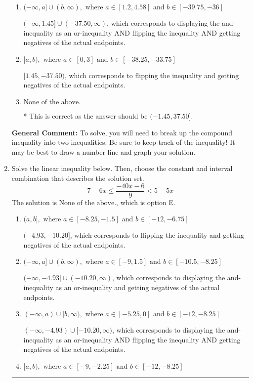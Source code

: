 \documentclass{extbook}[14pt]
\newcommand{\litem}[1]{\item #1

\rule{\textwidth}{0.4pt}}
\begin{document}
\begin{enumerate}
{\begin{enumerate}[label=\Alph*.]
$(1.45, -37.50]$, which is the correct interval but negatives of the actual endpoints.
\item \( (-\infty, a] \cup (b, \infty), \text{ where } a \in [1.2, 4.58] \text{ and } b \in [-39.75, -36] \)

$(-\infty, 1.45] \cup (-37.50, \infty)$, which corresponds to displaying the and-inequality as an or-inequality AND flipping the inequality AND getting negatives of the actual endpoints.
\item \( [a, b), \text{ where } a \in [0, 3] \text{ and } b \in [-38.25, -33.75] \)

$[1.45, -37.50)$, which corresponds to flipping the inequality and getting negatives of the actual endpoints.
\item \( \text{None of the above.} \)

* This is correct as the answer should be $(-1.45, 37.50]$.
\end{enumerate}

\textbf{General Comment:} To solve, you will need to break up the compound inequality into two inequalities. Be sure to keep track of the inequality! It may be best to draw a number line and graph your solution.
}
\litem{
Solve the linear inequality below. Then, choose the constant and interval combination that describes the solution set.
\[ 7 - 6 x \leq \frac{-40 x - 6}{9} < 5 - 5 x \]The solution is \( \text{None of the above.} \), which is option E.\begin{enumerate}[label=\Alph*.]
\item \( (a, b], \text{ where } a \in [-8.25, -1.5] \text{ and } b \in [-12, -6.75] \)

$(-4.93, -10.20]$, which corresponds to flipping the inequality and getting negatives of the actual endpoints.
\item \( (-\infty, a] \cup (b, \infty), \text{ where } a \in [-9, 1.5] \text{ and } b \in [-10.5, -8.25] \)

$(-\infty, -4.93] \cup (-10.20, \infty)$, which corresponds to displaying the and-inequality as an or-inequality and getting negatives of the actual endpoints.
\item \( (-\infty, a) \cup [b, \infty), \text{ where } a \in [-5.25, 0] \text{ and } b \in [-12, -8.25] \)

$(-\infty, -4.93) \cup [-10.20, \infty)$, which corresponds to displaying the and-inequality as an or-inequality AND flipping the inequality AND getting negatives of the actual endpoints.
\item \( [a, b), \text{ where } a \in [-9, -2.25] \text{ and } b \in [-12, -8.25] \)


\end{enumerate}}
\end{enumerate}
\end{document}
